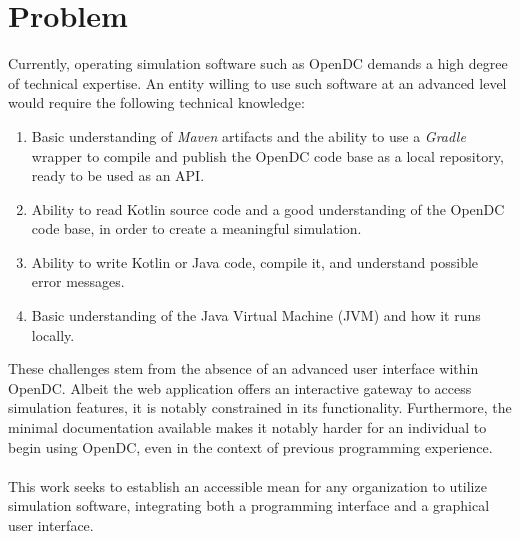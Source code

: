 \section{Problem}
Currently, operating simulation software such as OpenDC demands a high degree of technical expertise. An entity willing to use such software at an advanced level would require the following technical knowledge:
\begin{enumerate}
    \item Basic understanding of \textit{Maven} artifacts and the ability to use a \textit{Gradle} wrapper to compile and publish the OpenDC code base as a local repository, ready to be used as an API.
    \item Ability to read Kotlin source code and a good understanding of the OpenDC code base, in order to create a meaningful simulation.
    \item Ability to write Kotlin or Java code, compile it, and understand possible error messages.
    \item Basic understanding of the Java Virtual Machine (JVM) and how it runs locally.
\end{enumerate}
These challenges stem from the absence of an advanced user interface within OpenDC. Albeit the web application offers an interactive gateway to access simulation features, it is notably constrained in its functionality. Furthermore, the minimal documentation available makes it notably harder for an individual to begin using OpenDC, even in the context of previous programming experience.
\\\\
This work seeks to establish an accessible mean for any organization to utilize simulation software, integrating both a programming interface and a graphical user interface.